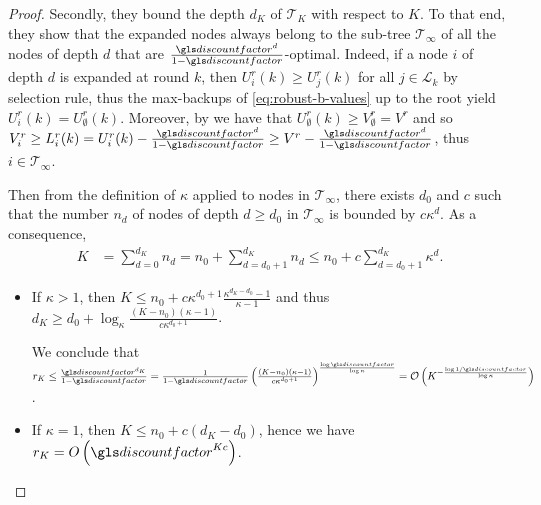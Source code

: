 \begin{subappendices}
\begin{proof}
		Secondly, they bound the depth $d_K$ of $\mathcal{T}_K$ with respect to $K$. To that end, they show that the expanded nodes always belong to the sub-tree $\mathcal{T}_\infty$ of all the nodes of depth $d$ that are $\frac{\discount^d}{1-\discount}$-optimal. Indeed, if a node $i$ of depth $d$ is expanded at round $k$, then $U_i^r(k) \geq U_j^r(k)$ for all $j\in \mathcal{L}_k$ by selection rule, thus the max-backups of \eqref{eq:robust-b-values} up to the root yield $U^r_i(k) = U_\emptyset^r(k)$. Moreover, by  we have that $U_\emptyset^r(k) \geq V_\emptyset^r = V^r$ and so $V_i^r \geq L_i^r(k) = U_i^r(k) - \frac{\discount^d}{1-\discount} \geq V^r - \frac{\discount^d}{1-\discount}$, thus $i \in \mathcal{T}_\infty$.
		
		Then from the definition of $\kappa$ applied to nodes in $\mathcal{T}_\infty$, there exists $d_0$ and $c$ such that the number $n_d$ of nodes of depth $d \geq d_0$ in $\mathcal{T}_\infty$ is bounded by $c\kappa^d$. As a consequence, 
		\begin{eqnarray*}
			K &= \sum_{d=0}^{d_K} n_d = n_0 + \sum_{d=d_0+1}^{d_K} n_d \leq n_0 + c\sum_{d={d_0+1}}^{d_K} \kappa^d.
		\end{eqnarray*}
		
		\begin{itemize}
			\item If $\kappa > 1$, then $K \leq n_0 + c\kappa^{d_0+1}\frac{\kappa^{d_K-d_0}-1}{\kappa-1}$ and thus $d_K \geq d_0 + \log_\kappa \frac{(K-n_0)(\kappa - 1)}{c\kappa^{d_0+1}}$.
			
			We conclude that $r_K \leq \frac{\discount^{d_K}}{1-\discount} = \frac{1}{1-\discount} \left( \frac{(K-n_0)(\kappa - 1)}{c\kappa^{d_0+1}} \right)^\frac{\log \discount}{\log \kappa} = \cO\left(K^{-\frac{\log 1/\discount}{\log \kappa}}\right)$.
			
			\item If $\kappa = 1$, then $K \leq n_0 + c(d_K-d_0)$, hence we have $r_K = O\left(\discount^{Kc}\right)$.
		\end{itemize}
	\end{proof}
	

\end{subappendices}
